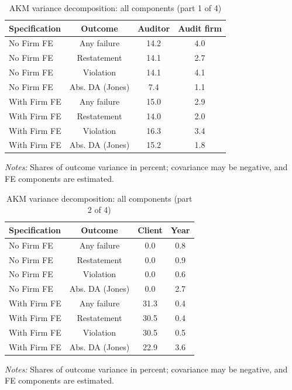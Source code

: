 \begin{table}[htbp]
\footnotesize
\centering
\caption{AKM variance decomposition: all components (part 1 of 4)}
\begin{threeparttable}
\begin{tabular}{p{}ccc}
\toprule
Specification & Outcome & Auditor & Audit firm \\
\midrule
No Firm FE & Any failure & 14.2 & 4.0 \\
No Firm FE & Restatement & 14.1 & 2.7 \\
No Firm FE & Violation & 14.1 & 4.1 \\
No Firm FE & Abs. DA (Jones) & 7.4 & 1.1 \\
With Firm FE & Any failure & 15.0 & 2.9 \\
With Firm FE & Restatement & 14.0 & 2.0 \\
With Firm FE & Violation & 16.3 & 3.4 \\
With Firm FE & Abs. DA (Jones) & 15.2 & 1.8 \\
\bottomrule
\end{tabular}
\begin{tablenotes}\footnotesize
\item \raggedright \textit{Notes:} Shares of outcome variance in percent; covariance may be negative, and FE components are estimated.
\end{tablenotes}
\end{threeparttable}
\end{table}

\begin{table}[htbp]
\footnotesize
\centering
\caption{AKM variance decomposition: all components (part 2 of 4)}
\begin{threeparttable}
\begin{tabular}{p{}ccc}
\toprule
Specification & Outcome & Client & Year \\
\midrule
No Firm FE & Any failure & 0.0 & 0.8 \\
No Firm FE & Restatement & 0.0 & 0.9 \\
No Firm FE & Violation & 0.0 & 0.6 \\
No Firm FE & Abs. DA (Jones) & 0.0 & 2.7 \\
With Firm FE & Any failure & 31.3 & 0.4 \\
With Firm FE & Restatement & 30.5 & 0.4 \\
With Firm FE & Violation & 30.5 & 0.5 \\
With Firm FE & Abs. DA (Jones) & 22.9 & 3.6 \\
\bottomrule
\end{tabular}
\begin{tablenotes}\footnotesize
\item \raggedright \textit{Notes:} Shares of outcome variance in percent; covariance may be negative, and FE components are estimated.
\end{tablenotes}
\end{threeparttable}
\end{table}


